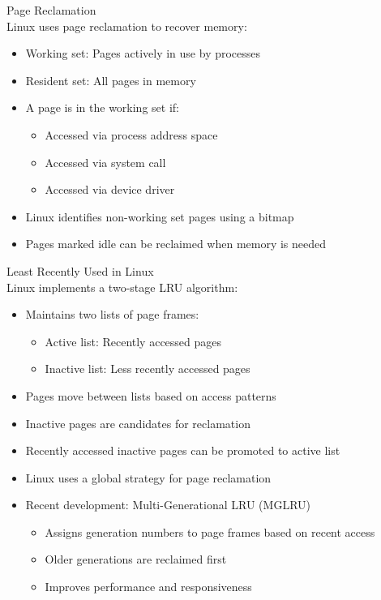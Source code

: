 \begin{definition}{Page Reclamation}\\
    Linux uses page reclamation to recover memory:
    \begin{itemize}
        \item Working set: Pages actively in use by processes
        \item Resident set: All pages in memory
        \item A page is in the working set if:
            \begin{itemize}
                \item Accessed via process address space
                \item Accessed via system call
                \item Accessed via device driver
            \end{itemize}
        \item Linux identifies non-working set pages using a bitmap
        \item Pages marked idle can be reclaimed when memory is needed
    \end{itemize}
\end{definition}

\begin{definition}{Least Recently Used in Linux}\\
    Linux implements a two-stage LRU algorithm:
    \begin{itemize}
        \item Maintains two lists of page frames:
            \begin{itemize}
                \item Active list: Recently accessed pages
                \item Inactive list: Less recently accessed pages
            \end{itemize}
        \item Pages move between lists based on access patterns
        \item Inactive pages are candidates for reclamation
        \item Recently accessed inactive pages can be promoted to active list
        \item Linux uses a global strategy for page reclamation
        \item Recent development: Multi-Generational LRU (MGLRU)
            \begin{itemize}
                \item Assigns generation numbers to page frames based on recent access
                \item Older generations are reclaimed first
                \item Improves performance and responsiveness
            \end{itemize}
    \end{itemize}
\end{definition}

